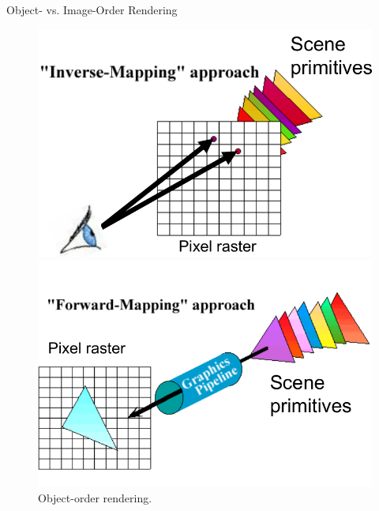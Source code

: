 \documentclass{beamer}
\begin{document}
\begin{frame}{Object- vs. Image-Order Rendering}

	\begin{figure}
		\centering
		\begin{minipage}{.5\textwidth}
			\centering
			\includegraphics[width=.8\linewidth]{image-order}
			\caption{Image-order rendering.}
		\end{minipage}%
		\begin{minipage}{.5\textwidth}
			\centering
			\includegraphics[width=.8\linewidth]{object-order}
			\caption{Object-order rendering.}
		\end{minipage}
	\end{figure}

\end{frame}
\end{document}
